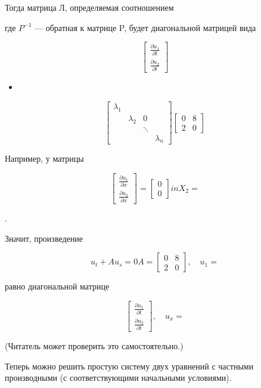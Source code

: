 \documentclass[
  ukrainian,
]{article}
\providecommand{\tightlist}{%
  \setlength{\itemsep}{0pt}\setlength{\parskip}{0pt}}
\begin{document}
Тогда матрица Л, определяемая соотношением

где \(P^{-1}\) --- обратная к матрице P, будет диагональной матрицей
вида

\[
\begin{bmatrix} \frac{\partial u_1}{\partial t} \\ \frac{\partial u_2}{\partial t} \end{bmatrix}
\]

\begin{itemize}
\tightlist
\item
\end{itemize}

\[
\begin{bmatrix} \lambda_1 & & & \\ & \lambda_2 & 0 & \\ & & \ddots & \\ & & & \lambda_n \end{bmatrix}
\begin{bmatrix} 0 & 8 \\ 2 & 0 \end{bmatrix}
\]

Например, у матрицы

\[
\begin{bmatrix} \frac{\partial u_1}{\partial x} \\ \frac{\partial u_2}{\partial x} \end{bmatrix}
=
\begin{bmatrix} 0 \\ 0 \end{bmatrix}
in  X_2 =
\]

.

Значит, произведение

\[
u_t + Au_s = 0
A =
\begin{bmatrix} 0 & 8 \\ 2 & 0 \end{bmatrix}
, \quad u_1 =
\]

равно диагональной матрице

\[
\begin{bmatrix} \frac{\partial u_1}{\partial t} \\ \frac{\partial u_2}{\partial t} \end{bmatrix}
, \quad u_x =
\]

(Читатель может проверить это самостоятельно.)

Теперь можно решить простую систему двух уравнений с частными
производными (с соответствующими начальными условиями).
\end{document}
